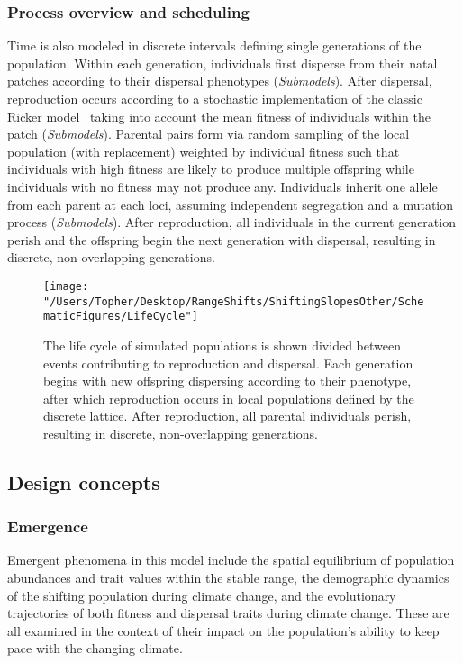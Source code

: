 \documentclass[11pt, oneside]{article}
\begin{document}
\subsubsection{Process overview and scheduling}
Time is also modeled in discrete intervals defining single generations of the population. Within each generation, individuals first disperse from their natal patches according to their dispersal phenotypes (\textit{Submodels}). After dispersal, reproduction occurs according to a stochastic implementation of the classic Ricker model~\citep{ricker1954stock} taking into account the mean fitness of individuals within the patch (\textit{Submodels}). Parental pairs form via random sampling of the local population (with replacement) weighted by individual fitness such that individuals with high fitness are likely to produce multiple offspring while individuals with no fitness may not produce any. Individuals inherit one allele from each parent at each loci, assuming independent segregation and a mutation process (\textit{Submodels}). After reproduction, all individuals in the current generation perish and the offspring begin the next generation with dispersal, resulting in discrete, non-overlapping generations. 

\begin{figure}
\centering
\texttt{[image: "/Users/Topher/Desktop/RangeShifts/ShiftingSlopesOther/SchematicFigures/LifeCycle"]}
\vspace{-5mm}
\caption[LoF entry]{The life cycle of simulated populations is shown divided between events contributing to reproduction and dispersal. Each generation begins with new offspring dispersing according to their phenotype, after which reproduction occurs in local populations defined by the discrete lattice. After reproduction, all parental individuals perish, resulting in discrete, non-overlapping generations.}
\label{fig:LifeCycle}
\end{figure}

\subsection{Design concepts}
\subsubsection{Emergence}
Emergent phenomena in this model include the spatial equilibrium of population abundances and trait values within the stable range, the demographic dynamics of the shifting population during climate change, and the evolutionary trajectories of both fitness and dispersal traits during climate change. These are all examined in the context of their impact on the population's ability to keep pace with the changing climate.  
\end{document}
